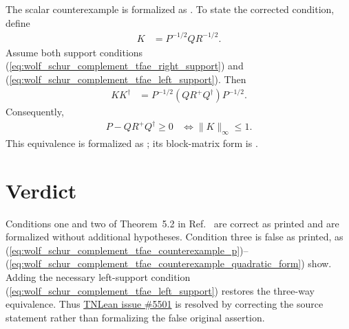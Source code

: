 \documentclass{article}
\begin{document}
The scalar counterexample is formalized as
. To state the
corrected condition, define
\begin{align}
    K&=P^{-1/2}QR^{-1/2}.
    \label{eq:wolf_schur_complement_tfae_contraction_operator}
\end{align}
Assume both support conditions
(\ref{eq:wolf_schur_complement_tfae_right_support}) and
(\ref{eq:wolf_schur_complement_tfae_left_support}). Then
\begin{align}
    KK^\dagger
        &=
        P^{-1/2}(QR^+Q^\dagger)P^{-1/2}.
    \label{eq:wolf_schur_complement_tfae_contraction_product}
\end{align}
Consequently,
\begin{align}
    P-QR^+Q^\dagger\geq0
        &\Longleftrightarrow
        \lVert K\rVert_\infty\leq1.
    \label{eq:wolf_schur_complement_tfae_corrected_contraction_equivalence}
\end{align}
This equivalence is formalized as
; its
block-matrix form is
.

\section{Verdict}

Conditions one and two of Theorem~5.2 in
Ref.~\cite{Wolf2012Quantum} are correct as printed and are formalized without
additional hypotheses. Condition three is false as printed, as
(\ref{eq:wolf_schur_complement_tfae_counterexample_p})--%
(\ref{eq:wolf_schur_complement_tfae_counterexample_quadratic_form}) show.
Adding the necessary left-support condition
(\ref{eq:wolf_schur_complement_tfae_left_support}) restores the three-way
equivalence. Thus
\href{https://github.com/LionSR/TNLean/issues/5501}{TNLean issue \#5501} is
resolved by correcting the source statement rather than formalizing the false
original assertion.



\end{document}
